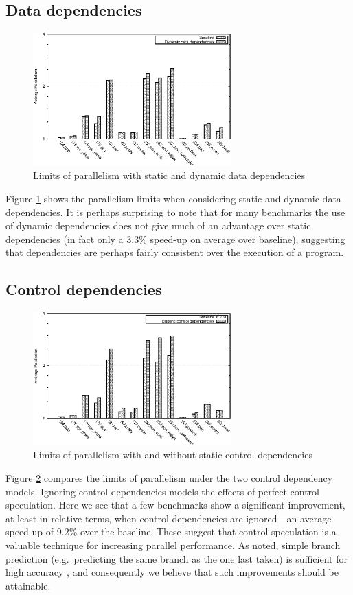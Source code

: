\subsection{Data dependencies}

\begin{figure}
 \centering
 \includegraphics[width=3in]{spec-data}
 \caption{Limits of parallelism with static and dynamic data dependencies}
 \label{spec-data}
\end{figure}

Figure \ref{spec-data} shows the parallelism limits when considering static and dynamic data dependencies.
It is perhaps surprising to note that for many benchmarks the use of dynamic dependencies does not give much of an advantage over static dependencies (in fact only a 3.3\% speed-up on average over baseline), suggesting that dependencies are perhaps fairly consistent over the execution of a program.

\subsection{Control dependencies}

\begin{figure}
 \centering
 \includegraphics[width=3in]{spec-ctl}
 \caption{Limits of parallelism with and without static control dependencies}
 \label{spec-ctl}
\end{figure}

Figure \ref{spec-ctl} compares the limits of parallelism under the two control dependency models.
Ignoring control dependencies models the effects of perfect control speculation.
Here we see that a few benchmarks show a significant improvement, at least in relative terms, when control dependencies are ignored---an average speed-up of 9.2\% over the baseline.
These suggest that control speculation is a valuable technique for increasing parallel performance.
As noted, simple branch prediction (e.g.\ predicting the same branch as the one last taken) is sufficient for high accuracy \cite{smith98study}, and consequently we believe that such improvements should be attainable.

